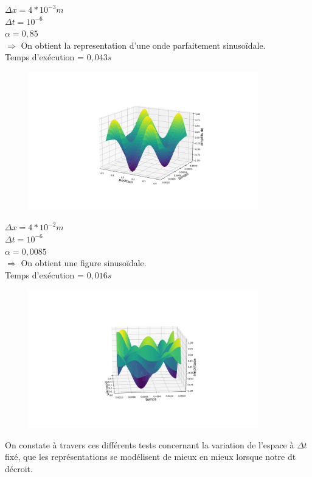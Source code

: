 \begin{enumerate}[label=\alph*)]

\begin{minipage}{.45\textwidth}%

\item $\Delta x=4*{10}^{-3}m$ \\
$\Delta t= {10}^{-6}$ \\
$\alpha= 0,85$\\


$\Longrightarrow$ On obtient la representation d'une onde parfaitement sinusoïdale.\\
Temps d'exécution = $0,043s$

\end{minipage}%
\hfill
\begin{minipage}{.6\textwidth}%

\includegraphics[width=12cm,height=6cm]{dt=10^-6 et dx=0.004.png}

\end{minipage}%
\newline
\begin{minipage}{.45\textwidth}%
\item $\Delta x=4*{10}^{-2}m$ \\
$\Delta t= {10}^{-6}$ \\
$\alpha= 0,0085$\\


$\Longrightarrow$ On obtient une figure sinusoïdale.\\
Temps d'exécution = $0,016s$

\end{minipage}%
\begin{minipage}{.45\textwidth}%
\includegraphics[width=12cm,height=6cm]{dt=10^-6 avec dx=0.04.png}
\end{minipage}%

On constate à travers ces différents tests concernant la variation de l'espace à $\Delta t$ fixé, que les représentations se modélisent de mieux en mieux lorsque notre dt décroit.


\end{enumerate}


